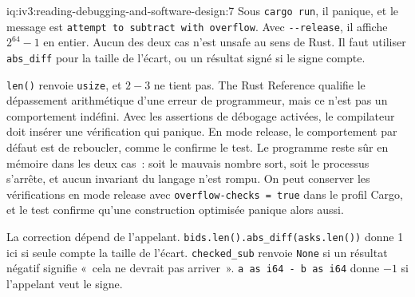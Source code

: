 \begin{solution}{iq:iv3:reading-debugging-and-software-design:7}
Sous \texttt{cargo run}, il panique, et le message est \texttt{attempt to subtract with overflow}. Avec \texttt{-{}-release}, il affiche $2^{64} - 1$ en entier. Aucun des deux cas n'est unsafe au sens de Rust. Il faut utiliser \texttt{abs\_diff} pour la taille de l'écart, ou un résultat signé si le signe compte.

\texttt{len()} renvoie \texttt{usize}, et $2 - 3$ ne tient pas. The Rust Reference qualifie le dépassement arithmétique d'une erreur de programmeur, mais ce n'est pas un comportement indéfini. Avec les assertions de débogage activées, le compilateur doit insérer une vérification qui panique. En mode release, le comportement par défaut est de reboucler, comme le confirme le test. Le programme reste sûr en mémoire dans les deux cas~: soit le mauvais nombre sort, soit le processus s'arrête, et aucun invariant du langage n'est rompu. On peut conserver les vérifications en mode release avec \texttt{overflow-checks = true} dans le profil Cargo, et le test confirme qu'une construction optimisée panique alors aussi.

La correction dépend de l'appelant. \texttt{bids.len().abs\_diff(asks.len())} donne 1 ici si seule compte la taille de l'écart. \texttt{checked\_sub} renvoie \texttt{None} si un résultat négatif signifie «~cela ne devrait pas arriver~». \texttt{a as i64 - b as i64} donne $-1$ si l'appelant veut le signe.


\end{solution}

